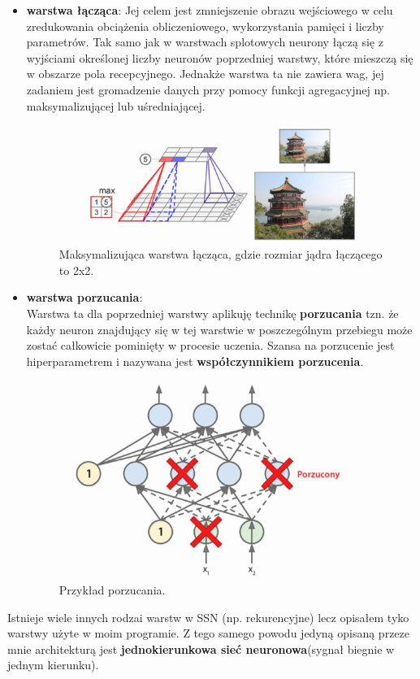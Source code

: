 \documentclass{article}
\begin{document}
\begin{itemize}
\item \textbf{warstwa łącząca}:
Jej celem jest zmniejszenie obrazu wejściowego w celu zredukowania obciążenia obliczeniowego,
wykorzystania pamięci i liczby parametrów. Tak samo jak w warstwach splotowych neurony 
łączą się z wyjściami określonej liczby neuronów poprzedniej warstwy, które mieszczą się w
obszarze pola recepcyjnego. Jednakże warstwa ta nie zawiera wag, jej zadaniem jest gromadzenie
danych przy pomocy funkcji agregacyjnej np. maksymalizującej lub uśredniającej.

\begin{figure}[H]
\centering
\includegraphics[scale=0.6]{pool.png}
\caption{Maksymalizująca warstwa łącząca, gdzie rozmiar jądra łączącego to 2x2.}
\end{figure}

\item \textbf{warstwa porzucania}:\\
Warstwa ta dla poprzedniej warstwy aplikuję technikę \textbf{porzucania} tzn. że
każdy neuron znajdujący się w tej warstwie w poszczególnym przebiegu może zostać całkowicie
pominięty w procesie uczenia. Szansa na porzucenie jest hiperparametrem i nazywana jest 
\textbf{współczynnikiem porzucenia}.

\begin{figure}[H]
\centering
\includegraphics[scale=0.6]{dropout.png}
\caption{Przykład porzucania.}
\end{figure}

\end{itemize}
Istnieje wiele innych rodzai warstw w SSN (np. rekurencyjne) lecz opisałem tyko warstwy
użyte w moim programie. Z tego samego powodu jedyną opisaną przeze mnie architekturą jest
\textbf{jednokierunkowa sieć neuronowa}(sygnał biegnie w jednym kierunku).
\end{document}
